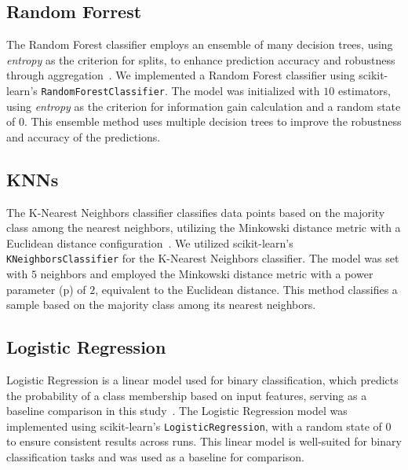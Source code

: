 \documentclass[11pt]{article}
\begin{document}
\subsection{Random Forrest}
The Random Forest classifier employs an ensemble of many decision trees, using \textit{entropy} as the criterion for splits, to enhance prediction accuracy and robustness through aggregation~\cite{rigatti2017random}. We implemented a Random Forest classifier using scikit-learn's \texttt{RandomForestClassifier}. The model was initialized with $10$ estimators, using \textit{entropy} as the criterion for information gain calculation and a random state of $0$. This ensemble method uses multiple decision trees to improve the robustness and accuracy of the predictions.

\subsection{KNNs}
The K-Nearest Neighbors classifier classifies data points based on the majority class among the nearest neighbors, utilizing the Minkowski distance metric with a Euclidean distance configuration~\cite{peterson2009k}.
We utilized scikit-learn's \texttt{KNeighborsClassifier} for the K-Nearest Neighbors classifier. The model was set with $5$ neighbors and employed the Minkowski distance metric with a power parameter (p) of $2$, equivalent to the Euclidean distance. This method classifies a sample based on the majority class among its nearest neighbors.


\subsection{Logistic Regression}
Logistic Regression is a linear model used for binary classification, which predicts the probability of a class membership based on input features, serving as a baseline comparison in this study~\cite{lavalley2008logistic}.
The Logistic Regression model was implemented using scikit-learn's \texttt{LogisticRegression}, with a random state of $0$ to ensure consistent results across runs. This linear model is well-suited for binary classification tasks and was used as a baseline for comparison.
\end{document}
